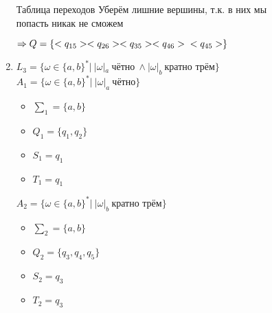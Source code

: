 \documentclass{article}
\begin{document}
\begin{enumerate}
            \begin{center}
                Таблица переходов
                \newpage
                 Уберём лишние вершины, т.к. в них мы \\
                 попасть никак не сможем
            \end{center}
            
            \begin{center}
                $\Rightarrow Q = \{ <q_{15}> <q_{26}> <q_{35}> <q_{46}> \\ <q_{45}> \} $ \\
            \end{center}            
            

        \item $ L_3 = \{ \omega \in \{a,b\}^*| \ |\omega|_a \ \text{чётно} \  \land |\omega|_b \  \text{кратно трём} \}$ \\
        
            $A_1 = \{ \omega \in \{a,b\}^*| \ |\omega|_a \ \text{чётно} \}$
            \begin{center}
            \end{center}
            
            \begin{itemize}
                \item $\sum_1 = \{ a,b \}$ \\
                \item $Q_1 = \{ q_1, q_2 \} $ \\
                \item $S_1 = q_1$ \\
                \item $T_1 = q_1$ \\
            \end{itemize}

            $A_2 = \{ \omega \in \{a,b\}^*| \ |\omega|_b \  \text{кратно трём} \}$ \\
            \begin{center}
            \end{center}
            
            \begin{itemize}
                \item $\sum_2 = \{ a,b \}$ \\
                \item $Q_2 = \{ q_3, q_4, q_5 \} $ \\
                \item $S_2 = q_3$ \\
                \item $T_2 = q_3$ \\
            \end{itemize}
        

\end{enumerate}
\end{document}

